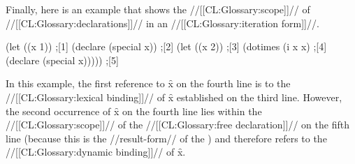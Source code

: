 Finally, here is an example that shows the //[[CL:Glossary:scope]]// of
//[[CL:Glossary:declarations]]// in an //[[CL:Glossary:iteration form]]//.

\code
 (let ((x  1))                     ;[1]
   (declare (special x))           ;[2]
     (let ((x 2))                  ;[3]
       (dotimes (i x x)            ;[4]
         (declare (special x)))))  ;[5]
\endcode

In this example, the first reference to \f{x} on the fourth line is to
the //[[CL:Glossary:lexical binding]]// of \f{x} established on the third line.
However, the second occurrence of \f{x} on the fourth line lies within
the //[[CL:Glossary:scope]]// of the //[[CL:Glossary:free declaration]]// on the fifth line
(because this is the //result-form// of the )
and therefore refers to the //[[CL:Glossary:dynamic binding]]// of \f{x}.


\endsubsubsection%

\endSubsection%
